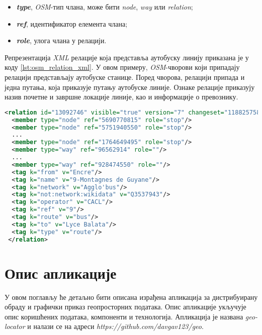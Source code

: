 \documentclass[12pt,oneside]{memoir}
\begin{document}
\begin{itemize}
	\item \textbf{\textit{type}}, \textit{OSM}-тип члана, може бити \textit{node}, \textit{way} или \textit{relation};
	\item \textbf{\textit{ref}}, идентификатор елемента члана;
	\item \textbf{\textit{role}}, улога члана у релацији.
\end{itemize}

Репрезентација \textit{XML} релације која представља аутобуску линију приказана је у коду \ref{lst:osm_relation_xml}. У овом примеру, \textit{OSM}-чворови који припадају релацији представљају аутобуске станице. Поред чворова, релацији припада и једна путања, која приказује путању аутобуске линије. Ознаке релације приказују назив почетне и завршне локације линије, као и информације о превознику.

\begin{lstlisting}[language=XML, caption={Запис \textit{XML} \textit{OSM}-релације која представља аутобуску линију}, label={lst:osm_relation_xml}]
<relation id="13092746" visible="true" version="7" changeset="118825758" timestamp="2022-03-23T15:05:48Z" user="" uid="">
  <member type="node" ref="5690770815" role="stop"/>
  <member type="node" ref="5751940550" role="stop"/>
  ...
  <member type="node" ref="1764649495" role="stop"/>
  <member type="way" ref="96562914" role=""/>
  ...
  <member type="way" ref="928474550" role=""/>
  <tag k="from" v="Encre"/>
  <tag k="name" v="9-Montagnes de Guyane"/>
  <tag k="network" v="Agglo'bus"/>
  <tag k="not:network:wikidata" v="Q3537943"/>
  <tag k="operator" v="CACL"/>
  <tag k="ref" v="9"/>
  <tag k="route" v="bus"/>
  <tag k="to" v="Lyce Balata"/>
  <tag k="type" v="route"/>
 </relation>
\end{lstlisting}


\chapter{Опис апликације}
\label{chp:app}

У овом поглављу ће детаљно бити описана израђена апликација за дистрибуирану обраду и графички приказ геопросторних података. Опис апликације укључује опис коришћених података, компоненти и технологија. Апликација је названа \textit{geo-locator} и налази се на адреси \textit{https://github.com/davgav123/geo}.
\end{document}
